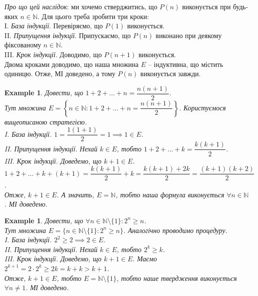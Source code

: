 \documentclass[a4paper, 14pt]{article}
\theoremstyle{theoremdd}
\theoremstyle{theoremdd}
\theoremstyle{theoremdd}
\theoremstyle{theoremdd}
\newtheorem{example}[theorem]{Example}
\theoremstyle{theoremdd}
\theoremstyle{theoremdd}
\theoremstyle{theoremdd}
\theoremstyle{theoremdd}
\begin{document}
	\textit{Про що цей наслідок}: ми хочемо стверджитись, що $P(n)$ виконується при будь-яких $n \in \mathbb{N}$. Для цього треба зробити три кроки:\\
	I. \textit{База індукції}. Перевіряємо, що $P(1)$ виконується.\\
	II. \textit{Припущення індукції}. Припускаємо, що $P(n)$ виконано при деякому фіксованому $n \in \mathbb{N}$.\\
	III. \textit{Крок індукції}. Доводимо, що $P(n+1)$ виконується.
	\bigskip \\
	Двома кроками доводимо, що наша множина $E$ -- індуктивна, що містить одиницю. Отже, МІ доведено, а тому $P(n)$ виконується завжди.
	
	\begin{example}
	Довести, що $1 + 2 + \dots + n = \dfrac{n(n+1)}{2}$.\\
	Тут множина $E = \left\{n \in \mathbb{N}: 1 + 2 + \dots + n = \dfrac{n(n+1)}{2} \right\}$. Користуємося вищеописаною стратегією.\\
	I. \textit{База індукції}. $1 = \dfrac{1(1+1)}{2} = 1 \implies 1 \in E$.\\
	II. \textit{Припущення індукції}. Нехай $k \in E$, тобто  $1 + 2 + \dots + k = \dfrac{k(k+1)}{2}$.\\
	III. \textit{Крок індукції}. Доведемо, що $k+1 \in E$.\\
	$1+ 2 + \dots + k + (k+1) = \dfrac{k(k+1)}{2} + k = \dfrac{k(k+1)+2k}{2} = \dfrac{(k+1)(k+2)}{2}$.\\
	Отже, $k+1 \in E$.
	А значить, $E = \mathbb{N}$, тобто наша формула виконується $\forall n \in \mathbb{N}$. МІ доведено.
	\end{example}
	
	\begin{example}
	Довести, що $\forall n \in \mathbb{N} \setminus \{1\}: 2^n \geq n$.\\
	Тут множина $E = \{n \in \mathbb{N} \setminus \{1\}: 2^n \geq n \}$. Аналогічно проводимо процедуру.\\
	I. \textit{База індукції}. $2^2 \geq 2 \implies  2 \in E$.\\
	II. \textit{Припущення індукції}. Нехай $k \in E$, тобто $2^k \geq k$.\\
	III. \textit{Крок індукції}. Доведемо, що $k+1 \in E$. Маємо\\
	$2^{k+1} = 2 \cdot 2^k \geq 2k = k + k > k+1$.\\
	Отже, $k+1 \in E$, тобто $E = \mathbb{N} \setminus \{1\}$, тобто наше твердження виконується $\forall n \neq 1$. МІ доведено.
	\end{example}
	
\end{document}
